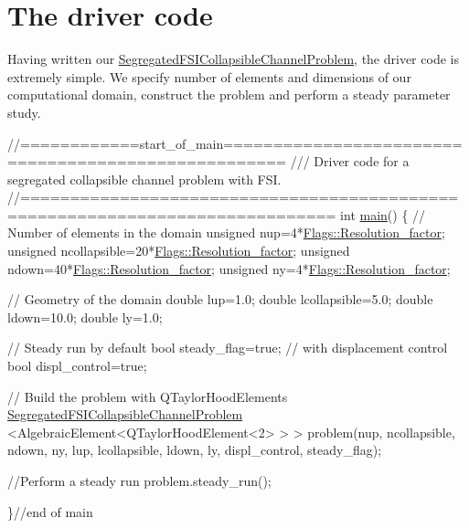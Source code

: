  

\hypertarget{index_main}{}\section{The driver code}\label{index_main}
Having written our {\ttfamily \hyperlink{classSegregatedFSICollapsibleChannelProblem}{Segregated\+F\+S\+I\+Collapsible\+Channel\+Problem}}, the driver code is extremely simple. We specify number of elements and dimensions of our computational domain, construct the problem and perform a steady parameter study.

 
\begin{DoxyCodeInclude}
\textcolor{comment}{//============start\_of\_main====================================================}
\textcolor{comment}{/// Driver code for a segregated collapsible channel problem with FSI.}
\textcolor{comment}{}\textcolor{comment}{//=============================================================================}
\textcolor{keywordtype}{int} \hyperlink{simple__segregated__driver_8cc_ae66f6b31b5ad750f1fe042a706a4e3d4}{main}()
\{
 \textcolor{comment}{// Number of elements in the domain}
 \textcolor{keywordtype}{unsigned} nup=4*\hyperlink{namespaceFlags_a7c2437aa0b6a4f27df951f1cbcef7337}{Flags::Resolution\_factor};
 \textcolor{keywordtype}{unsigned} ncollapsible=20*\hyperlink{namespaceFlags_a7c2437aa0b6a4f27df951f1cbcef7337}{Flags::Resolution\_factor};
 \textcolor{keywordtype}{unsigned} ndown=40*\hyperlink{namespaceFlags_a7c2437aa0b6a4f27df951f1cbcef7337}{Flags::Resolution\_factor};
 \textcolor{keywordtype}{unsigned} ny=4*\hyperlink{namespaceFlags_a7c2437aa0b6a4f27df951f1cbcef7337}{Flags::Resolution\_factor};
  
 
 \textcolor{comment}{// Geometry of the domain}
 \textcolor{keywordtype}{double} lup=1.0;
 \textcolor{keywordtype}{double} lcollapsible=5.0;
 \textcolor{keywordtype}{double} ldown=10.0;
 \textcolor{keywordtype}{double} ly=1.0;
 
 \textcolor{comment}{// Steady run by default}
 \textcolor{keywordtype}{bool} steady\_flag=\textcolor{keyword}{true};
 \textcolor{comment}{// with displacement control}
 \textcolor{keywordtype}{bool} displ\_control=\textcolor{keyword}{true};

 \textcolor{comment}{// Build the problem with QTaylorHoodElements}
 \hyperlink{classSegregatedFSICollapsibleChannelProblem}{SegregatedFSICollapsibleChannelProblem}
  <AlgebraicElement<QTaylorHoodElement<2> > > 
  problem(nup, ncollapsible, ndown, ny, 
          lup, lcollapsible, ldown, ly, displ\_control,
          steady\_flag);
 
 \textcolor{comment}{//Perform a steady run}
 problem.steady\_run();
 
\}\textcolor{comment}{//end of main}

\end{DoxyCodeInclude}




